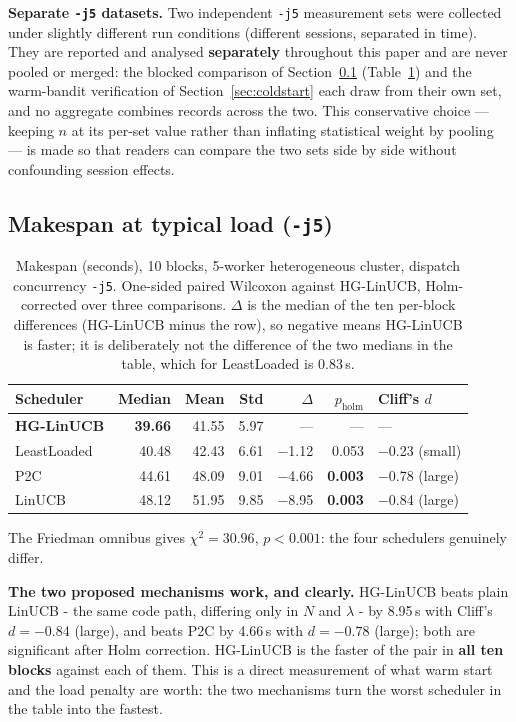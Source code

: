 \documentclass[final,5p,times,twocolumn]{elsarticle}
\begin{document}
\textbf{Separate \texttt{-j5} datasets.} Two independent \texttt{-j5} measurement sets were collected under slightly different run conditions (different sessions, separated in time). They are reported and analysed \textbf{separately} throughout this paper and are never pooled or merged: the blocked comparison of Section~\ref{sec:j5} (Table~\ref{tab:j5}) and the warm-bandit verification of Section~\ref{sec:coldstart} each draw from their own set, and no aggregate combines records across the two. This conservative choice --- keeping $n$ at its per-set value rather than inflating statistical weight by pooling --- is made so that readers can compare the two sets side by side without confounding session effects.

\subsection{Makespan at typical load (\texttt{-j5})}
\label{sec:j5}

\begin{table}[t]
\centering
\caption{Makespan (seconds), 10 blocks, 5-worker heterogeneous cluster, dispatch concurrency \texttt{-j5}. One-sided paired Wilcoxon against HG-LinUCB, Holm-corrected over three comparisons. $\Delta$ is the median of the ten per-block differences (HG-LinUCB minus the row), so negative means HG-LinUCB is faster; it is deliberately not the difference of the two medians in the table, which for LeastLoaded is 0.83\,s.}
\label{tab:j5}
\small
\begin{tabular}{lrrrrrp{3.2cm}}
\toprule
Scheduler & Median & Mean & Std & $\Delta$ & $p_{\text{holm}}$ & Cliff's $d$ \\
\midrule
\textbf{HG-LinUCB} & \textbf{39.66} & 41.55 & 5.97 & --- & --- & --- \\
LeastLoaded & 40.48 & 42.43 & 6.61 & $-$1.12 & 0.053 & $-$0.23 (small) \\
P2C & 44.61 & 48.09 & 9.01 & $-$4.66 & \textbf{0.003} & $-$0.78 (large) \\
LinUCB & 48.12 & 51.95 & 9.85 & $-$8.95 & \textbf{0.003} & $-$0.84 (large) \\
\bottomrule
\end{tabular}
\end{table}

The Friedman omnibus gives $\chi^2=30.96$, $p<0.001$: the four schedulers genuinely differ.

\textbf{The two proposed mechanisms work, and clearly.} HG-LinUCB beats plain LinUCB - the same code path, differing only in $N$ and $\lambda$ - by 8.95\,s with Cliff's $d=-0.84$ (large), and beats P2C by 4.66\,s with $d=-0.78$ (large); both are significant after Holm correction. HG-LinUCB is the faster of the pair in \textbf{all ten blocks} against each of them. This is a direct measurement of what warm start and the load penalty are worth: the two mechanisms turn the worst scheduler in the table into the fastest.
\end{document}
